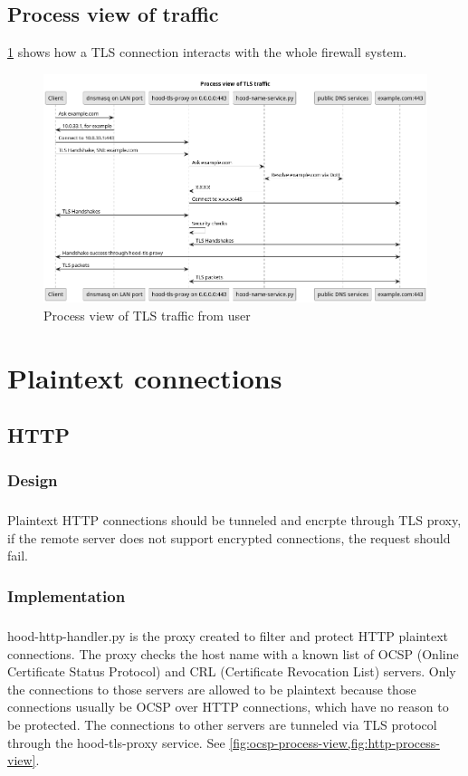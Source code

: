 \documentclass[mscthesis]{usiinfthesis}
\begin{document}
\section{Process view of traffic}
\cref{fig:tls-process-view} shows how a TLS connection interacts with the whole firewall system.
\begin{figure}[H]
  \includegraphics[width=\textheight, angle=90]{graphics/puml/process-tls-traffic.png}
  \caption{Process view of TLS traffic from user}
  \label{fig:tls-process-view}
\end{figure}

\chapter{Plaintext connections}

\section{HTTP}
\subsection{Design}
\paragraph{}
Plaintext HTTP connections should be tunneled and encrpte through TLS proxy, if the remote server does not support encrypted connections, the request should fail.
\subsection{Implementation}
\paragraph{}
hood-http-handler.py is the proxy created to filter and protect HTTP plaintext connections. The proxy checks the host name with a known list of OCSP (Online Certificate Status Protocol) and CRL (Certificate Revocation List) servers. Only the connections to those servers are allowed to be plaintext because those connections usually be OCSP over HTTP connections, which have no reason to be protected. The connections to other servers are tunneled via TLS protocol through the hood-tls-proxy service. See \cref{fig:ocsp-process-view,fig:http-process-view}.
\end{document}
